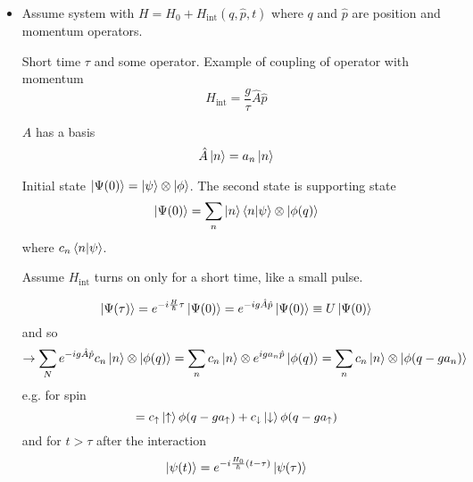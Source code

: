 \documentclass[11pt, a4paper]{article}
\newcommand{\ua}{\uparrow}  %
\newcommand{\da}{\downarrow}  %
\begin{document}
\begin{itemize}
    \item Assume system with $ H = H_{0} + H_{\text{int}}(q, \hat{p}, t) $ where $ q $ and $ \hat{p} $ are position and momentum operators. 

    Short time $ \tau $ and some operator. Example of coupling of operator with momentum
    \begin{equation*}
        H_{\text{int}} = \frac{g}{\tau} \hat{A} \hat{p}
    \end{equation*}

    $ A $ has a basis
    \begin{equation*}
        \hat{A}\ket{n} = a_{n}\ket{n}
    \end{equation*}
    
    Initial state $ \ket{\Psi(0)} = \ket{\psi} \otimes \ket{\phi} $. The second state is supporting state
    \begin{equation*}
        \ket{\Psi(0)} = \sum_{n}\ket{n}\braket{n}{\psi} \otimes \ket{\phi(q)}
    \end{equation*}
    where $ c_{n} \braket{n}{\psi} $.
    
    Assume $ H_{\text{int}} $ turns on only for a short time, like a small pulse.


    \begin{equation*}
        \ket{\Psi(\tau)} = e^{-i \frac{H}{\hbar}\tau} \ket{\Psi(0)} = e^{-ig \hat{A}\hat{p}} \ket{\Psi(0)} \equiv U \ket{\Psi(0)}
    \end{equation*}
    and so 
    \begin{equation*}
        \to \sum_{N} e^{-ig \hat{A}\hat{p}} c_{n}\ket{n} \otimes \ket{\phi(q)} = \sum_{n}c_{n}\ket{n}\otimes e^{i g a_{n} \hat{p}}\ket{\phi(q)} = \sum_{n}c_{n}\ket{n} \otimes \ket{\phi(q - ga_{n})} 
    \end{equation*}
    e.g. for spin
    \begin{equation*}
        = c_{\ua}\ket{\ua} \phi(q - ga_{\ua}) + c_{\da}\ket{\da}\phi(q - ga_{\ua})
    \end{equation*}
    and for $ t > \tau $ after the interaction
    \begin{equation*}
        \ket{\psi(t)} = e^{-i \frac{H_{0}}{\hbar}(t- \tau)} \ket{\psi(\tau)}
    \end{equation*}
    

\end{itemize}
\end{document}
